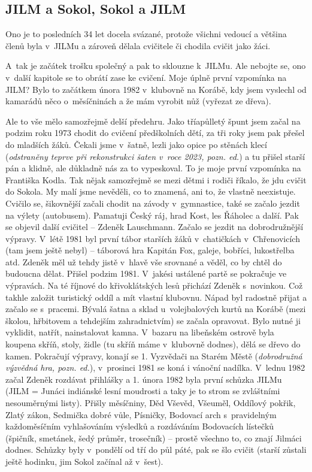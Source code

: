 \documentclass[a5paper, 12pt, twoside]{article}
\begin{document}
\subsection{JILM a Sokol, Sokol a JILM}

Ono je to posledních 34 let docela svázané, protože všichni vedoucí a
většina členů byla v~JILMu a zároveň dělala cvičitele či chodila cvičit
jako žáci.

A~tak je začátek trošku společný a pak to sklouzne k~JILMu. Ale nebojte
se, ono v~další kapitole se to obrátí zase ke cvičení. Moje úplně první
vzpomínka na JILM? Bylo to začátkem února 1982 v~klubovně na Korábě, kdy
jsem vyslechl od kamarádů něco o~měsíčninách a že mám vyrobit nůž
(vyřezat ze dřeva).

Ale to vše mělo samozřejmě delší předehru. Jako tříapůlletý špunt jsem
začal na podzim roku 1973 chodit do cvičení předškolních dětí, za tři
roky jsem pak přešel do mladších žáků. Čekali jsme v~šatně, lezli jako
opice po stěnách klecí (\textit{odstraněny teprve při rekonstrukci šaten
v~roce 2023, pozn. ed.}) a tu přišel starší pán a klidně, ale důkladně nás
za to vypeskoval. To je moje první vzpomínka na Františka Kodla. Tak
nějak samozřejmě se mezi dětmi i rodiči říkalo, že jdu cvičit do Sokola.
My malí jsme nevěděli, co to znamená, ani to, že vlastně neexistuje.
Cvičilo se, šikovnější začali chodit na závody v~gymnastice, také se
začalo jezdit na výlety (autobusem). Pamatuji Český ráj, hrad Kost, les
Řáholec a další. Pak se objevil další cvičitel -- Zdeněk Lauschmann.
Začalo se jezdit na dobrodružnější výpravy. V~létě 1981 byl první tábor
starších žáků v~chatičkách v~Chřenovicích (tam jsem ještě nebyl) --
táborová hra Kapitán Fox, galeje, bobříci, lukostřelba atd. Zdeněk měl
už tehdy jistě v~hlavě vše srovnané a věděl, co by chtěl do budoucna
dělat. Přišel podzim 1981. V~jakési ustálené partě se pokračuje ve
výpravách. Na té říjnové do křivoklátských lesů přichází Zdeněk
s~novinkou. Což takhle založit turistický oddíl a mít vlastní klubovnu.
Nápad byl radostně přijat a začalo se s~pracemi. Bývalá šatna a sklad
u~volejbalových kurtů na Korábě (mezi školou, hřbitovem a tehdejším
zahradnictvím) se začala opravovat. Bylo nutné ji vyklidit, natřít,
nainstalovat kamna. V~bazaru na libeňském ostrově byla koupena skříň,
stoly, židle (tu skříň máme v~klubovně dodnes), dělá se dřevo do kamen.
Pokračují výpravy, konají se 1. Vyzvědači na Starém Městě
(\textit{dobrodružná výzvědná hra, pozn. ed.}), v~prosinci 1981 se koná i
vánoční nadílka. V~lednu 1982 začal Zdeněk rozdávat přihlášky a 1. února
1982 byla první schůzka JILMu (JILM = Junáci indiánské lesní moudrosti a
taky je to strom se zvláštními nesouměrnými listy). Přišly měsíčniny,
Děd Vševěd, Všeuměl, Oddílový pokřik, Zlatý zákon, Sedmička dobré vůle,
Písničky, Bodovací arch s~pravidelným každoměsíčním vyhlašováním
výsledků a rozdáváním Bodovacích lístečků (špičník, smetánek, šedý
průměr, trosečník) -- prostě všechno to, co znají Jilmáci dodnes.
Schůzky byly v~pondělí od tří do půl páté, pak se šlo cvičit (starší
zůstali ještě hodinku, jim Sokol začínal až v~šest).
\end{document}
